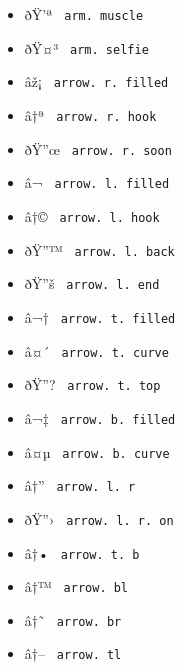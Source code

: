 \begin{itemize}
\item
  \label{symbol-arm.muscle}{{ ðŸ'ª }
  \texttt{\ arm.\ muscle\ }}
\item
  \label{symbol-arm.selfie}{{ ðŸ¤³ }
  \texttt{\ arm.\ selfie\ }}
\item
  \label{symbol-arrow.r.filled}{{ âž¡ }
  \texttt{\ arrow.\ r.\ filled\ }}
\item
  \label{symbol-arrow.r.hook}{{ â†ª }
  \texttt{\ arrow.\ r.\ hook\ }}
\item
  \label{symbol-arrow.r.soon}{{ ðŸ''œ }
  \texttt{\ arrow.\ r.\ soon\ }}
\item
  \label{symbol-arrow.l.filled}{{ â¬ }
  \texttt{\ arrow.\ l.\ filled\ }}
\item
  \label{symbol-arrow.l.hook}{{ â†© }
  \texttt{\ arrow.\ l.\ hook\ }}
\item
  \label{symbol-arrow.l.back}{{ ðŸ''™ }
  \texttt{\ arrow.\ l.\ back\ }}
\item
  \label{symbol-arrow.l.end}{{ ðŸ''š }
  \texttt{\ arrow.\ l.\ end\ }}
\item
  \label{symbol-arrow.t.filled}{{ â¬† }
  \texttt{\ arrow.\ t.\ filled\ }}
\item
  \label{symbol-arrow.t.curve}{{ â¤´ }
  \texttt{\ arrow.\ t.\ curve\ }}
\item
  \label{symbol-arrow.t.top}{{ ðŸ''? }
  \texttt{\ arrow.\ t.\ top\ }}
\item
  \label{symbol-arrow.b.filled}{{ â¬‡ }
  \texttt{\ arrow.\ b.\ filled\ }}
\item
  \label{symbol-arrow.b.curve}{{ â¤µ }
  \texttt{\ arrow.\ b.\ curve\ }}
\item
  \label{symbol-arrow.l.r}{{ â†'' }
  \texttt{\ arrow.\ l.\ r\ }}
\item
  \label{symbol-arrow.l.r.on}{{ ðŸ''› }
  \texttt{\ arrow.\ l.\ r.\ on\ }}
\item
  \label{symbol-arrow.t.b}{{ â†• }
  \texttt{\ arrow.\ t.\ b\ }}
\item
  \label{symbol-arrow.bl}{{ â†™ }
  \texttt{\ arrow.\ bl\ }}
\item
  \label{symbol-arrow.br}{{ â†˜ }
  \texttt{\ arrow.\ br\ }}
\item
  \label{symbol-arrow.tl}{{ â†-- }
  \texttt{\ arrow.\ tl\ }}

\end{itemize}
